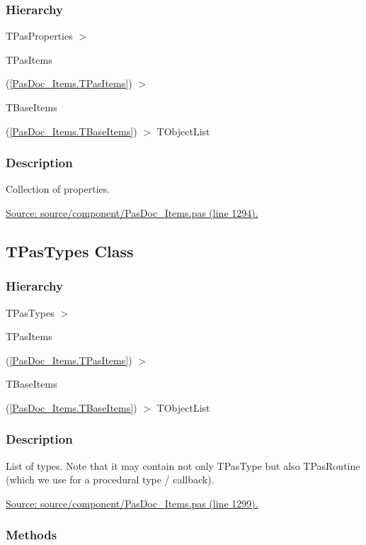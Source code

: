 \documentclass{report}
\newif\ifpdf
\begin{document}
\subsubsection*{\large{\textbf{Hierarchy}}\normalsize\hspace{1ex}\hfill}
TPasProperties {$>$} \begin{ttfamily}TPasItems\end{ttfamily}(\ref{PasDoc_Items.TPasItems}) {$>$} \begin{ttfamily}TBaseItems\end{ttfamily}(\ref{PasDoc_Items.TBaseItems}) {$>$} 
TObjectList
\subsubsection*{\large{\textbf{Description}}\normalsize\hspace{1ex}\hfill}
Collection of properties.\par
\href{https://github.com/pasdoc/pasdoc/blob/master/source/component/PasDoc_Items.pas#L1294}{Source: source/component/PasDoc{\_}Items.pas (line 1294).}\ifpdf
\subsection*{\large{\textbf{TPasTypes Class}}\normalsize\hspace{1ex}\hrulefill}
\else
\subsection*{TPasTypes Class}
\fi
\label{PasDoc_Items.TPasTypes}
\subsubsection*{\large{\textbf{Hierarchy}}\normalsize\hspace{1ex}\hfill}
TPasTypes {$>$} \begin{ttfamily}TPasItems\end{ttfamily}(\ref{PasDoc_Items.TPasItems}) {$>$} \begin{ttfamily}TBaseItems\end{ttfamily}(\ref{PasDoc_Items.TBaseItems}) {$>$} 
TObjectList
\subsubsection*{\large{\textbf{Description}}\normalsize\hspace{1ex}\hfill}
List of types. Note that it may contain not only TPasType but also TPasRoutine (which we use for a procedural type / callback).\par
\href{https://github.com/pasdoc/pasdoc/blob/master/source/component/PasDoc_Items.pas#L1299}{Source: source/component/PasDoc{\_}Items.pas (line 1299).}\subsubsection*{\large{\textbf{Methods}}\normalsize\hspace{1ex}\hfill}
\end{document}
